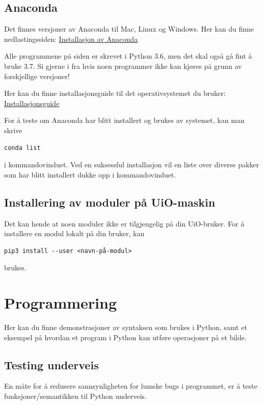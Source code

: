 \documentclass[%
oneside,                 %
final,                   %
10pt]{article}
\begin{document}
\subsection{Anaconda}
Det finnes versjoner av Anaconda til Mac, Linux og Windows. Her kan du finne nedlastingssiden: \href{{https://www.anaconda.com/download/#linux}}{Installasjon av Anaconda}

Alle programmene på siden er skrevet i Python 3.6, men det skal også gå fint å bruke 3.7.
Si gjerne i fra hvis noen programmer ikke kan kjøres på grunn av forskjellige versjoner!

Her kan du finne installasjonsguide til det operativsystemet du bruker: \href{{https://docs.anaconda.com/anaconda/install/}}{Installasjonsguide}

For å teste om Anaconda har blitt installert og brukes av systemet, kan man skrive
\begin{verbatim}
conda list
\end{verbatim}
i kommandovinduet.
Ved en suksessful installasjon vil en liste over diverse pakker som har blitt installert dukke opp i kommandovinduet.

\subsection{Installering av moduler på UiO-maskin}
Det kan hende at noen moduler ikke er tilgjengelig på din UiO-bruker. For å installere en modul lokalt på din bruker, kan
\begin{verbatim}
pip3 install --user <navn-på-modul>
\end{verbatim}
brukes.

\section{Programmering}
Her kan du finne demonstrasjoner av syntaksen som brukes i Python, samt et eksempel på hvordan et program i Python kan utføre operasjoner på et bilde.

\subsection{Testing underveis}
En måte for å redusere sannsynligheten for lumske bugs i programmet, er å teste funksjoner/semantikken til Python underveis.
\end{document}
